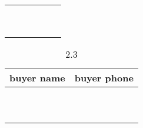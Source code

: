\documentclass[]{article}
\begin{document}
\begin{center}
\begin{longtable}{|c|c|c|c|c|c|}
			\phantom{1} & & &  \\
			\hline
				\phantom{1} & & &  \\
			\hline
			\phantom{1} & & &  \\
			\hline
				\phantom{1} & & &  \\
			\hline
			\phantom{1} & & &  \\
			\hline
				\phantom{1} & & &  \\
			\hline
			\phantom{1} & & &  \\
			\hline
				\phantom{1} & & &  \\
			\hline
			\phantom{1} & & &  \\
			\hline
				\phantom{1} & & &  \\
			\hline
			\hline
			\end{longtable}
		\end{center}

		\begin{center}
			\begin{longtable}{|c|c|}
			\caption{2.3} \\ 
			\hline
			\hline
			buyer name & buyer phone  \\ 
			\hline
				\phantom{1} &   \\
			\hline
				\phantom{1} &   \\
			\hline
			\phantom{1} &   \\
			\hline
				\phantom{1} &   \\
			\hline
			\phantom{1} &   \\
			\hline
				\phantom{1} &   \\
			\hline
			\phantom{1} &   \\
			\hline
				\phantom{1} &   \\
			\hline
			\phantom{1} &   \\
			\hline
				\phantom{1} &   \\
			\hline
			\hline
			\end{longtable}
		\end{center}
\end{document}
